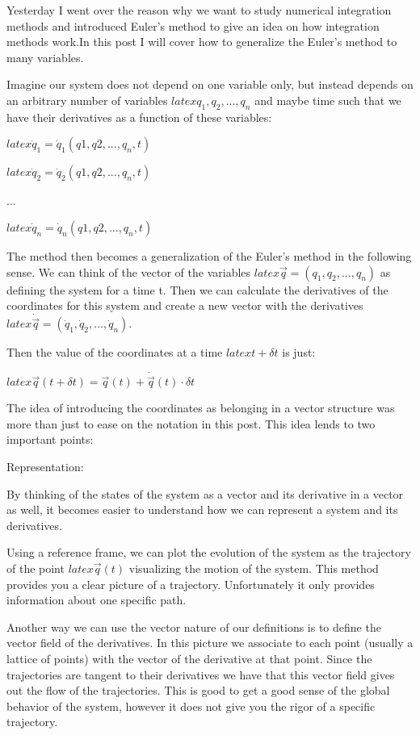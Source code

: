 Yesterday I went over the reason why we want to study numerical integration methods and introduced Euler's method to give an idea on how integration methods work.In this post I will cover how to generalize the Euler's method to many variables.

Imagine our system does not depend on one variable only, but instead depends on an arbitrary number of variables $latex q_1, q_2,..., q_n $ and maybe time such that we have their derivatives as a function of these variables:

$latex \dot q_1 = \dot q_1( q1, q2, ..., q_n, t) $

$latex \dot q_2 = \dot q_2( q1, q2, ..., q_n, t) $

...

$latex \dot q_n = \dot q_n( q1, q2, ..., q_n, t) $

The method then becomes a generalization of the Euler's method in the following sense. We can think of the vector of the variables $latex \vec q = (q_1,q_2, ..., q_n) $ as defining the system for a time t. Then we can calculate the derivatives of the coordinates for this system and create a new vector with the derivatives $latex \dot{\vec q } =(\dot q_1,\dot q_2, ..., \dot q_n) $.

Then the value of the coordinates at a time $latex t+\delta t $ is just:

$latex \vec q(t+\delta t) =\vec q(t) + \dot{\vec q} (t) \cdot \delta t $

The idea of introducing the coordinates as belonging in a vector structure was more than just to ease on the notation in this post. This idea lends to two important points:

    Representation:

By thinking of the states of the system as a vector and its derivative in a vector as well, it becomes easier to understand how we can represent a system and its derivatives.

Using a reference frame, we can plot the evolution of the system as the trajectory of the point $latex \vec q(t) $ visualizing the motion of the system. This method provides you a clear picture of a trajectory. Unfortunately it only provides information about one specific path.

Another way we can use the vector nature of our definitions is to define the vector field of the derivatives. In this picture we associate to each point (usually a lattice of points) with the vector of the derivative at that point. Since the trajectories are tangent to their derivatives we have that this vector field gives out the flow of the trajectories. This is good to get a good sense of the global behavior of the system, however it does not give you the rigor of a specific trajectory.

